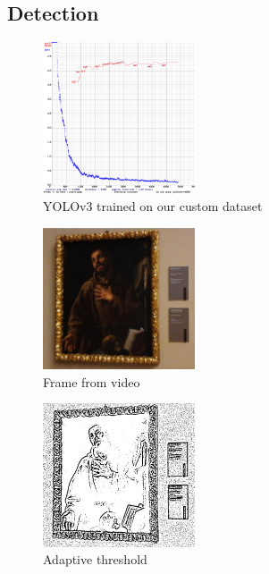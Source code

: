 \subsection{Detection}

\begin{figure}[h!]
    \centering
        \includegraphics[width=0.4\textwidth]{pictures/painting_detection/training-v3.png}
    \caption{YOLOv3 trained on our custom dataset}
    \label{fig:training-v3}
\end{figure} 

\begin{figure}[]
    \centering
        \includegraphics[width=0.4\textwidth]{pictures/painting_detection/Frame2.jpg}
    \caption{Frame from video}
    \label{fig:a}
\end{figure}

\begin{figure}[]
    \centering
        \includegraphics[width=0.4\textwidth]{pictures/painting_detection/Adaptive_threshold.jpg}
    \caption{Adaptive threshold}
    \label{fig:b}
\end{figure}

